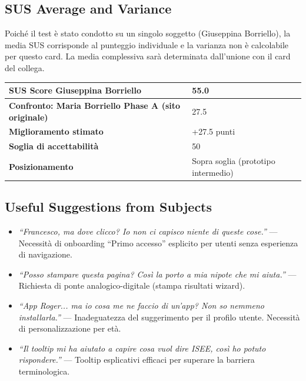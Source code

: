 \documentclass[11pt,a4paper]{article}
\begin{document}
\begin{tcolorbox}[colback=backgroundColor,colframe=primaryColor,arc=2mm]
\small

\subsection*{SUS Average and Variance}

\noindent Poich\'e il test \`e stato condotto su un singolo soggetto (Giuseppina Borriello), la media SUS corrisponde al punteggio individuale e la varianza non \`e calcolabile per questo card. La media complessiva sar\`a determinata dall'unione con il card del collega.

\vspace{0.2cm}
\begin{tabular}{|L{6cm}|C{2.5cm}|}
\hline
\textbf{SUS Score Giuseppina Borriello} & \textbf{55.0} \\
\hline
\textbf{Confronto: Maria Borriello Phase A (sito originale)} & 27.5 \\
\hline
\textbf{Miglioramento stimato} & +27.5 punti \\
\hline
\textbf{Soglia di accettabilit\`a} & 50 \\
\hline
\textbf{Posizionamento} & Sopra soglia (prototipo intermedio) \\
\hline
\end{tabular}

\vspace{0.3cm}
\subsection*{Useful Suggestions from Subjects}

\begin{itemize}
  \item \textit{``Francesco, ma dove clicco? Io non ci capisco niente di queste cose.''} --- Necessit\`a di onboarding ``Primo accesso'' esplicito per utenti senza esperienza di navigazione.
  \item \textit{``Posso stampare questa pagina? Cos\`i la porto a mia nipote che mi aiuta.''} --- Richiesta di ponte analogico-digitale (stampa risultati wizard).
  \item \textit{``App Roger... ma io cosa me ne faccio di un'app? Non so nemmeno installarla.''} --- Inadeguatezza del suggerimento per il profilo utente. Necessit\`a di personalizzazione per et\`a.
  \item \textit{``Il tooltip mi ha aiutato a capire cosa vuol dire ISEE, cos\`i ho potuto rispondere.''} --- Tooltip esplicativi efficaci per superare la barriera terminologica.
\end{itemize}


\end{tcolorbox}
\end{document}
